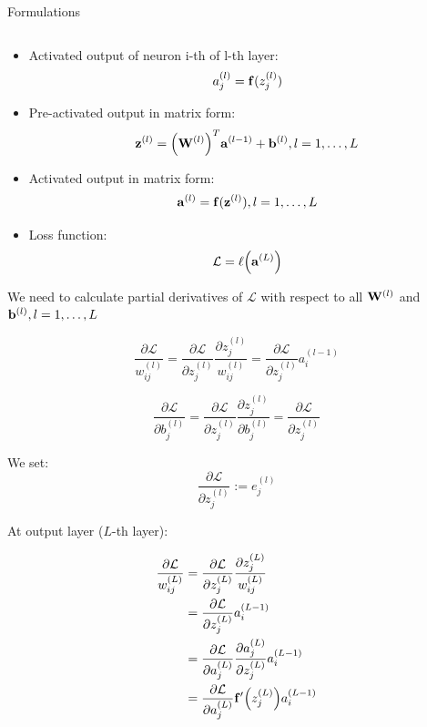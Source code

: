 \documentclass[10pt]{beamer}
\theoremstyle{remark}
\theoremstyle{definition}
\begin{document}
\begin{frame}[allowframebreaks]{Formulations}
\begin{itemize}
\begin{equation}
		\end{equation}
		\item Activated output of neuron i-th of l-th layer:
		\begin{equation}
			a_j^{(l)} = \bold{f}(z_j^{(l)})
		\end{equation}
		\item Pre-activated output in matrix form:
		\begin{equation}
			\bold{z}^{(l)}=\Big(\bold{W}^{(l)}\Big)^T\bold{a}^{(l-1)} + \bold{b}^{(l)}, l=1, \dots, L
		\end{equation}
		\item Activated output in matrix form:
		\begin{equation}
			\bold{a}^{(l)}=\bold{f}(\bold{z}^{(l)}), l=1, \dots, L
		\end{equation}
		\item Loss function:
		\begin{equation}
			\mathcal{L} = \ell\Big(\bold{a}^{(L)} \Big)
		\end{equation}
	\end{itemize}

	We need to calculate partial derivatives of $\mathcal{L}$ with respect to all $\bold{W}^{(l)}$ and $\bold{b}^{(l)}, l=1, \dots, L$

	\begin{equation}
		\dfrac{\partial \mathcal{L}}{w_{ij}^{(l)}}=\dfrac{\partial \mathcal{L}}{\partial z_{j}^{(l)}}\dfrac{\partial z_j^{(l)}}{w_{ij}^{(l)}}=\dfrac{\partial \mathcal{L}}{\partial z_{j}^{(l)}}a_i^{(l-1)}
	\end{equation}

	\begin{equation}
		\dfrac{\partial \mathcal{L}}{\partial b_j^{(l)}}=\dfrac{\partial \mathcal{L}}{\partial z_{j}^{(l)}}\dfrac{\partial z_j^{(l)}}{\partial b_j^{(l)}}=\dfrac{\partial \mathcal{L}}{\partial z_{j}^{(l)}}
	\end{equation}

	We set:
	\begin{equation}
		\dfrac{\partial \mathcal{L}}{\partial z_{j}^{(l)}}:=e_j^{(l)}
	\end{equation}

	At output layer ($L$-th layer):

	\begin{equation}
		\begin{aligned}
			\dfrac{\partial \mathcal{L}}{w_{ij}^{(L)}}&=\dfrac{\partial \mathcal{L}}{\partial z_{j}^{(L)}}\dfrac{\partial z_j^{(L)}}{w_{ij}^{(L)}}\\&=\dfrac{\partial \mathcal{L}}{\partial z_{j}^{(L)}}a_i^{(L-1)}\\&=\dfrac{\partial\mathcal{L}}{\partial a_j^{(L)}}\dfrac{\partial a_j^{(L)}}{\partial z_j^{(L)}}a_i^{(L-1)}\\&=\dfrac{\partial\mathcal{L}}{\partial a_j^{(L)}}\bold{f}^{\prime}\Big(z_j^{(L)}\Big)a_i^{(L-1)}
		\end{aligned}
	\end{equation}


\end{frame}
\end{document}
